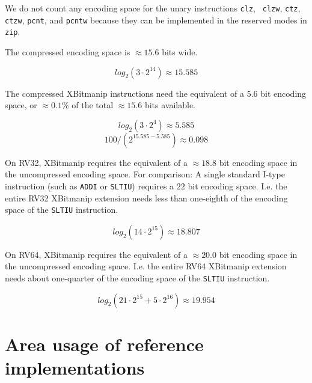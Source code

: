 We do not count any encoding space for the unary instructions {\tt clz}, {\tt
clzw}, {\tt ctz}, {\tt ctzw}, {\tt pcnt}, and {\tt pcntw} because they can
be implemented in the reserved modes in {\tt zip}.

The compressed encoding space is $\approx 15.6$ bits wide.

$$ log_2(3 \cdot 2^{14}) \approx 15.585 $$

The compressed XBitmanip instructions need the equivalent of a 5.6 bit
encoding space, or $\approx 0.1\%$ of the total $\approx 15.6$ bits available.

$$ log_2(3 \cdot 2^4) \approx 5.585 $$
$$ 100 / (2^{15.585-5.585}) \approx 0.098 $$

On RV32, XBitmanip requires the equivalent of a $\approx 18.8$ bit encoding space in
the uncompressed encoding space. For comparison: A single standard I-type
instruction (such as \texttt{ADDI} or \texttt{SLTIU}) requires a $22$ bit
encoding space. I.e. the entire RV32 XBitmanip extension needs less than
one-eighth of the encoding space of the \texttt{SLTIU} instruction.

$$ log_2(14\cdot2^{15}) \approx 18.807 $$

On RV64, XBitmanip requires the equivalent of a $\approx 20.0$ bit encoding
space in the uncompressed encoding space. I.e. the entire RV64 XBitmanip
extension needs about one-quarter of the encoding space of the \texttt{SLTIU}
instruction.

$$ log_2(21\cdot2^{15} + 5\cdot2^{16}) \approx 19.954 $$

\section{Area usage of reference implementations}

